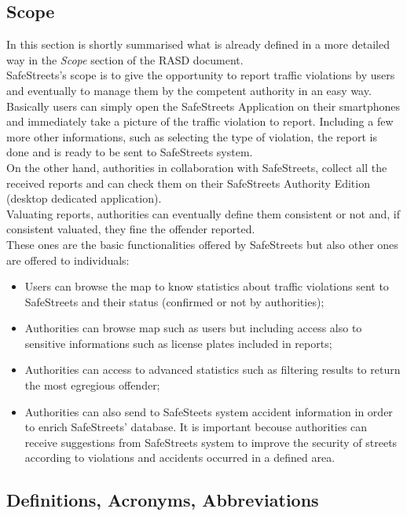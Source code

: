 \documentclass{article}
\begin{document}
		\subsection{Scope}
		In this section is shortly summarised what is already defined in a more detailed way in the \textit{Scope} section of the RASD document. \\
		SafeStreets's scope is to give the opportunity to report traffic violations by users and eventually to manage them by the competent authority in an easy way. Basically users can simply open the SafeStreets Application on their smartphones and immediately take a picture of the traffic violation to report. Including a few more other informations, such as selecting the type of violation, the report is done and is ready to be sent to SafeStreets system.\\ On the other hand, authorities in collaboration with SafeStreets, collect all the received reports and can check them on their SafeStreets Authority Edition (desktop dedicated application).\\ Valuating reports, authorities can eventually define them consistent or not and, if consistent valuated, they fine the offender reported.\\
		These ones are the basic functionalities offered by SafeStreets but also other ones are offered to individuals:
		\begin{itemize}
			\item Users can browse the map to know statistics about traffic violations sent to SafeStreets and their status (confirmed or not by authorities);
			\item Authorities can browse map such as users but including access also to sensitive informations such as license plates included in reports;
			\item Authorities can access to advanced statistics such as filtering results to return the most egregious offender;
			\item Authorities can also send to SafeSteets system accident information in order to enrich SafeStreets' database. It is important becouse authorities can receive suggestions from SafeStreets system to improve the security of streets according to violations and accidents occurred in a defined area.
		\end{itemize}
		\subsection{Definitions, Acronyms, Abbreviations}
\end{document}
